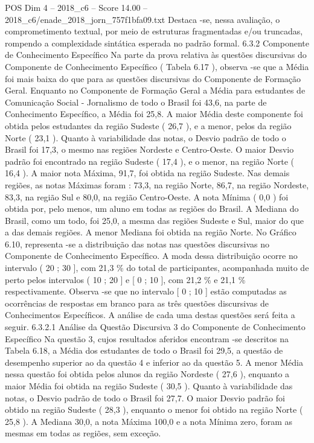 \begin{textsample}{POS Dim 4 – 2018\_c6 – Score 14.00 – 2018\_c6/enade\_2018\_jorn\_757f1bfa09.txt}
Destaca -se, nessa avaliação, o comprometimento textual, por meio de estruturas fragmentadas e/ou truncadas, rompendo a complexidade sintática esperada no padrão formal. 6.3.2 Componente de Conhecimento Específico Na parte da prova relativa às questões discursivas do Componente de Conhecimento Específico ( Tabela 6.17 ), observa -se que a Média foi mais baixa do que para as questões discursivas do Componente de Formação Geral.
Enquanto no Componente de Formação Geral a Média para estudantes de Comunicação Social - Jornalismo de todo o Brasil foi 43,6, na parte de Conhecimento Específico, a Média foi 25,8.
A maior Média deste componente foi obtida pelos estudantes da região Sudeste ( 26,7 ), e a menor, pelos da região Norte ( 23,1 ).
Quanto à variabilidade das notas, o Desvio padrão de todo o Brasil foi 17,3, o mesmo nas regiões Nordeste e Centro-Oeste.
O maior Desvio padrão foi encontrado na região Sudeste ( 17,4 ), e o menor, na região Norte ( 16,4 ).
A maior nota Máxima, 91,7, foi obtida na região Sudeste.
Nas demais regiões, as notas Máximas foram : 73,3, na região Norte, 86,7, na região Nordeste, 83,3, na região Sul e 80,0, na região Centro-Oeste.
A nota Mínima ( 0,0 ) foi obtida por, pelo menos, um aluno em todas as regiões do Brasil.
A Mediana do Brasil, como um todo, foi 25,0, a mesma das regiões Sudeste e Sul, maior do que a das demais regiões.
A menor Mediana foi obtida na região Norte.
No Gráfico 6.10, representa -se a distribuição das notas nas questões discursivas no Componente de Conhecimento Específico.
A moda dessa distribuição ocorre no intervalo ( 20 ; 30 ], com 21,3 \% do total de participantes, acompanhada muito de perto pelos intervalos ( 10 ; 20 ] e [ 0 ; 10 ], com 21,2 \% e 21,1 \% respectivamente.
Observa -se que no intervalo [ 0 ; 10 ] estão computadas as ocorrências de respostas em branco para as três questões discursivas de Conhecimentos Específicos.
A análise de cada uma destas questões será feita a seguir. 6.3.2.1 Análise da Questão Discursiva 3 do Componente de Conhecimento Específico Na questão 3, cujos resultados aferidos encontram -se descritos na Tabela 6.18, a Média dos estudantes de todo o Brasil foi 29,5, a questão de desempenho superior ao da questão 4 e inferior ao da questão 5.
A menor Média nessa questão foi obtida pelos alunos da região Nordeste ( 27,6 ), enquanto a maior Média foi obtida na região Sudeste ( 30,5 ).
Quanto à variabilidade das notas, o Desvio padrão de todo o Brasil foi 27,7.
O maior Desvio padrão foi obtido na região Sudeste ( 28,3 ), enquanto o menor foi obtido na região Norte ( 25,8 ).
A Mediana 30,0, a nota Máxima 100,0 e a nota Mínima zero, foram as mesmas em todas as regiões, sem exceção.

\end{textsample}
